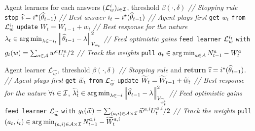 \begin{algorithm}[tb]
\centering
\caption{\LG}
\label{alg:lg}
\begin{algorithmic}[1]
     Agent learners for each answers $(\mathcal{L}^i_w)_{i\in\mathcal{I}}$, threshold $\beta(\cdot,\delta)$
        \State \textit{// Stopping rule}
            \State \texttt{stop} 
             $\widehat{\imath} = i^\star(\widehat{\theta}_{t-1})$
        \EndIf
        \State \textit{// Best answer}
        \State $i_{t} = i^\star(\widehat{\theta}_{t-1})$
        \State \textit{// Agent plays first}
        \State \texttt{get} $w_{t}$ \texttt{from} $\mathcal{L}^{i_t}_w$
        \State \texttt{update} $W_{t}=W_{t-1}+w_{t}$
        \State \textit{// Best response for the nature}
        \State $\lambda_{t} \in \operatorname*{arg\,min}_{\lambda\in\neg i_t}\left\lVert\widehat{\theta}_{t-1}-\lambda\right\rVert^2_{V_{w_{t}}}$
        \State \textit{// Feed optimistic gains}
        \State \texttt{feed learner} $\mathcal{L}_w^{i_{t}}$ \texttt{with} $g_{t}(w) = \sum_{a\in\mathcal{A}}w^a U_t^a/2$
        \State \textit{// Track the weights}
        \State \texttt{pull} $a_{t}\in \operatorname*{arg\,min}_{a\in \mathcal A } N_{t-1}^{a} - W_{t}^{a}$
   \EndFor
\end{algorithmic}
\end{algorithm}

\begin{algorithm}[tb]
\centering
\caption{\LGC}
\label{alg:lgc}
\begin{algorithmic}[1]
     Agent learner $\mathcal{L}_{\widetilde{w}}$, threshold $\beta(\cdot,\delta)$
        \State \textit{// Stopping rule}
             and {\bfseries return} $\widehat{\imath} = i^\star(\widehat{\theta}_{t-1})$. 
        \EndIf
        \State \textit{// Agent plays first}
        \State \texttt{get} $\widetilde{w}_{t}$ \texttt{from} $\mathcal{L}_{\widetilde{w}}$ 
        \State \texttt{update} $\widetilde{W}_{t}=\widetilde{W}_{t-1}+\widetilde{w}_{t}$
        \State \textit{// Best response for the nature}
        \State $\forall i\in\mathcal{I}$, $\widetilde{\lambda}^i_{t} \in \operatorname*{arg\,min}_{\lambda\in\neg i}\left\lVert\widehat{\theta}_{t-1}-\lambda\right\rVert^2_{V_{\widetilde{w}^i_{t}}}$
        \State \textit{// Feed optimistic gains}
        \State \texttt{feed learner} $\mathcal{L}_{\widetilde{w}}$ \texttt{with} {$g_{t}(\widetilde{w}) =\sum_{(a,i)\in\mathcal{A}\times\mathcal{I}} \widetilde{w}^{a,i} U_t^{a,i}/2$}
        \State \textit{// Track the weights}
        \State \texttt{pull} $(a_{t},i_{t})\in \operatorname*{arg\,min}_{(a,i)\in \mathcal A \times \mathcal I} N_{t-1}^{a,i} - \widetilde{W}_{t}^{a,i}$
    \EndFor
\end{algorithmic}
\end{algorithm}

